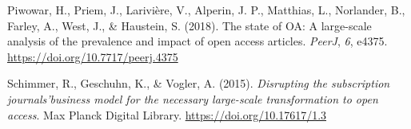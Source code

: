 \documentclass[a4paper,man,floatsintext,longtable,noextraspace,12pt]{apa6}
\newenvironment{CSLReferences}%
  {}%
  {\par}
\begin{document}
\begin{CSLReferences}{1}{0}
\leavevmode{}%
Piwowar, H., Priem, J., Larivière, V., Alperin, J. P., Matthias, L.,
Norlander, B., Farley, A., West, J., \& Haustein, S. (2018). The state
of {OA}: A large-scale analysis of the prevalence and impact of open
access articles. \emph{{PeerJ}}, \emph{6}, e4375.
\url{https://doi.org/10.7717/peerj.4375}

\leavevmode{}%
Schimmer, R., Geschuhn, K., \& Vogler, A. (2015). \emph{{Disrupting the
subscription journals'business model for the necessary large-scale
transformation to open access}}. Max Planck Digital Library.
\url{https://doi.org/10.17617/1.3}

\end{CSLReferences}
\end{document}

